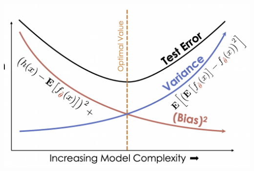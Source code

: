 \documentclass[10pt,landscape]{article}
\begin{document}
\begin{multicols}{3}
\includegraphics[width=\linewidth]{Bias-Variance.png}




\end{multicols}
\end{document}
